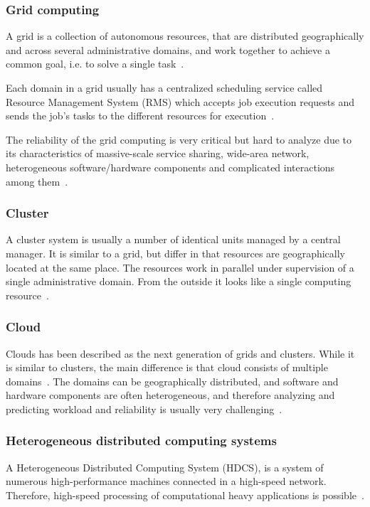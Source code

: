 \documentclass{cslthse-msc}
\begin{document}
\subsubsection{Grid computing}
A grid is a collection of autonomous resources, that are distributed geographically and across several administrative domains, and work together to achieve a common goal, i.e. to solve a single task~\cite{compStudyLoadAndCloud, relAndPerfGridServices, evalOfGridRel}.

Each domain in a grid usually has a centralized scheduling service called Resource Management System (RMS) which accepts job execution requests and sends the job's tasks to the different resources for execution~\cite{evalOfGridRel}.

The reliability of the grid computing is very critical but hard to analyze due to its characteristics of massive-scale service sharing, wide-area network, heterogeneous software/hardware components and complicated interactions among them~\cite{cloudServiceRel}.

\subsubsection{Cluster}
A cluster system is usually a number of identical units managed by a central manager. It is similar to a grid, but differ in that resources are geographically located at the same place. The resources work in parallel under supervision of a single administrative domain. From the outside it looks like a single computing resource~\cite{compStudyLoadAndCloud}.

\subsubsection{Cloud}
Clouds has been described as the next generation of grids and clusters. While it is similar to clusters, the main difference is that cloud consists of multiple domains~\cite{compStudyLoadAndCloud}. The domains can be geographically distributed, and software and hardware components are often heterogeneous, and therefore analyzing and predicting workload and reliability is usually very challenging~\cite{surveyReliabilityDistr}.

\subsubsection{Heterogeneous distributed computing systems}
A Heterogeneous Distributed Computing System (HDCS), is a system of numerous high-performance machines connected in a high-speed network. Therefore, high-speed processing of computational heavy applications is possible~\cite{algoMinExTime}. %
\end{document}
